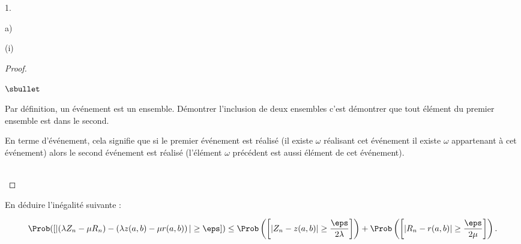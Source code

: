 \documentclass[11pt]{article}%
\begin{document}
\begin{noliste}{1.}
\begin{noliste}{a)}
\begin{noliste}{(i)}
\begin{proof}
    \begin{remarkL}{.98}%
      \begin{noliste}{$\sbullet$}
      \item Par définition, un événement est un ensemble. Démontrer
        l'inclusion de deux ensembles c'est démontrer que tout élément
        du premier ensemble est dans le second.
      \item En terme d'événement, cela signifie que si le premier
        événement est réalisé (il existe $\omega$ réalisant cet
        événement \ie il existe $\omega$ appartenant à cet événement)
        alors le second événement est réalisé (l'élément $\omega$
        précédent est aussi élément de cet événement).
      \end{noliste}
    \end{remarkL}~\\[-1.4cm]
  \end{proof}
	
	
	
	\newpage
	
      
    \item En déduire l'inégalité suivante :
    \end{noliste}
    \[
    \Prob([\vert(\lambda Z_n-\mu R_n)-\left(\lambda z(a,b) -\mu
      r(a,b)\right)\vert \geq \eps ]) \leq \Prob\left(\left[ \vert
        Z_n-z(a,b)\vert \geq \dfrac{\eps}{2\lambda}\right]\right) +
    \Prob\left(\left[\vert R_n-r(a,b)\vert \geq
        \dfrac{\eps}{2\mu}\right]\right).
    \]
    

\end{noliste}
\end{noliste}
\end{document}
